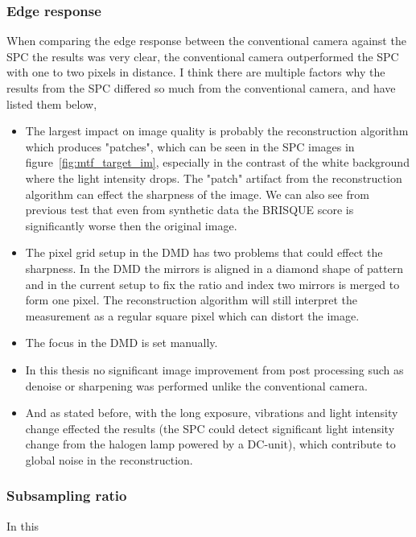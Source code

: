 \subsubsection{Edge response}
When comparing the edge response between the conventional camera against the SPC the results was very clear, the conventional camera outperformed the SPC with one to two pixels in distance. I think there are multiple factors why the results from the SPC differed so much from the conventional camera, and have listed them below,

\begin{itemize}
\item The largest impact on image quality is probably the reconstruction algorithm which produces "patches", which can be seen in the SPC images in figure~\ref{fig:mtf_target_im}, especially in the contrast of the white background where the light intensity drops. The "patch" artifact from the reconstruction algorithm can effect the sharpness of the image. We can also see from previous test that even from synthetic data the BRISQUE score is significantly worse then the original image.

\item The pixel grid setup in the DMD has two problems that could effect the sharpness. In the DMD the mirrors is aligned in a diamond shape of pattern and in the current setup to fix the ratio and index two mirrors is merged to form one pixel. The reconstruction algorithm will still interpret the measurement as a regular square pixel which can distort the image.

\item The focus in the DMD is set manually.

\item In this thesis no significant image improvement from post processing such as denoise or sharpening was performed unlike the conventional camera.

\item And as stated before, with the long exposure, vibrations and light intensity change effected the results (the SPC could detect significant light intensity change from the halogen lamp powered by a DC-unit), which contribute to global noise in the reconstruction.



\end{itemize}



\subsubsection{Subsampling ratio}
In this 



